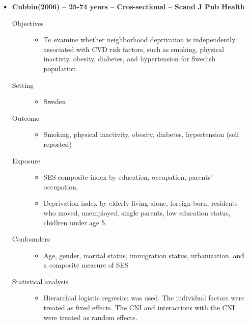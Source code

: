 \documentclass{article}
\begin{document}
\begin{itemize}
	\item{\bf Cubbin(2006) -- 25-74 years --  Cros-sectional -- Scand J Pub Health} 
		\begin{description}
			\item[Objectives]\mbox{}\par
				\begin{itemize}
					\item To examine whether neighborhood deprivation is independently associated with CVD risk factors, such as smoking, physical inactiviy, obesity, diabetes, and hypertension for Swedish population. 
				\end{itemize}
			\item[Setting] \mbox{}\par
				\begin{itemize}
					\item Sweden 
				\end{itemize}
			\item[Outcome]\mbox{}\par
				\begin{itemize}
					\item Smoking, physical inactivity, obesity, diabetes, hypertension (self reported)
				\end{itemize}
			\item[Exposure] \mbox{}\par
				\begin{itemize}
					\item SES composite index by education, occupation, parents' occupation. 
					\item Deprivation index by elderly living alone, foreign born, residents who moved, unemployed, single parents, low education status, chidlren under age 5.
				\end{itemize}
			\item[Confounders] \mbox{}\par
				\begin{itemize}
					\item Age, gender, marital status, immigration status, urbanization, and a composite measure of SES
				\end{itemize}
			\item[Statistical analysis] \mbox{}\par
				\begin{itemize}
					\item Hierarchial logistic regresion was used. The individual factors were treated as fixed effects. The CNI and interactions with the CNI were treated as random effects.

\end{itemize}
\end{description}
\end{itemize}
\end{document}
